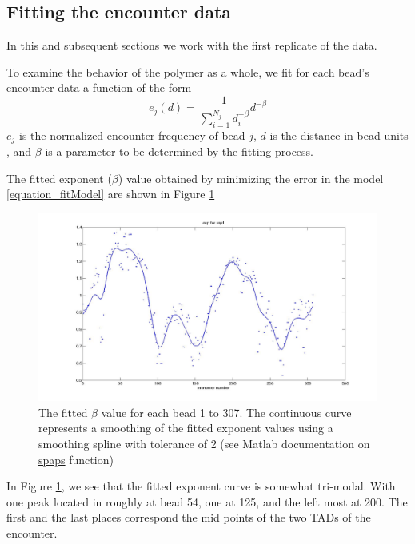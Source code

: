 \documentclass[12pt]{book}
\begin{document}
\subsection{Fitting the encounter data}\label{subsection_fittingTheEncounterData}
In this and subsequent sections we work with the first replicate of the data.

To examine the behavior of the polymer as a whole, we fit for each bead's encounter data 
a function of the form 
\begin{equation}\label{equation_fitModel}
e_j(d)= \frac{1}{\sum_{i=1}^{N_j}d_i^{-\beta}}d^{-\beta}
\end{equation}
$e_j$ is the normalized encounter frequency of bead $j$, $d$ is the distance in bead units , and $\beta$ is a parameter to be determined by the fitting process. 

The fitted exponent ($\beta$) value obtained by minimizing the error in the model \ref{equation_fitModel} are shown in Figure \ref{figure_fittedExpExperimentalData307Beads}
\begin{figure}[H]
\includegraphics[scale=0.15]{fittedExpValuesWithSplineRep1}
\caption{\scriptsize{The fitted $\beta$ value for each bead 1 to 307. The continuous curve represents a smoothing of the fitted exponent values using a smoothing spline with tolerance of 2 (see Matlab documentation on \href{http://www.mathworks.fr/fr/help/curvefit/spaps.html}{spaps} function)}}
\label{figure_fittedExpExperimentalData307Beads}
\end{figure}

In Figure \ref{figure_fittedExpExperimentalData307Beads}, we see that the fitted exponent curve is somewhat tri-modal. With one peak located in roughly at bead 54, one at 125, and the left most at 200. The first and the last places correspond the mid points of the two TADs of the encounter. 
\end{document}
